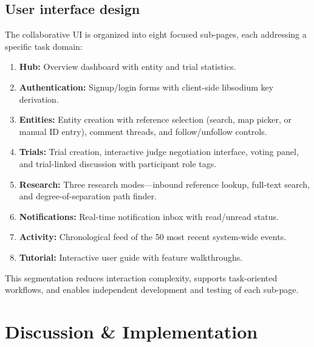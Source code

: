 \documentclass[13pt,a4paper]{report}
\begin{document}
\section{User interface design}
The collaborative UI is organized into eight focused sub-pages, each addressing a specific task domain:
\begin{enumerate}
    \item \textbf{Hub:} Overview dashboard with entity and trial statistics.
    \item \textbf{Authentication:} Signup/login forms with client-side libsodium key derivation.
    \item \textbf{Entities:} Entity creation with reference selection (search, map picker, or manual ID entry), comment threads, and follow/unfollow controls.
    \item \textbf{Trials:} Trial creation, interactive judge negotiation interface, voting panel, and trial-linked discussion with participant role tags.
    \item \textbf{Research:} Three research modes---inbound reference lookup, full-text search, and degree-of-separation path finder.
    \item \textbf{Notifications:} Real-time notification inbox with read/unread status.
    \item \textbf{Activity:} Chronological feed of the 50 most recent system-wide events.
    \item \textbf{Tutorial:} Interactive user guide with feature walkthroughs.
\end{enumerate}
This segmentation reduces interaction complexity, supports task-oriented workflows, and enables independent development and testing of each sub-page.

\chapter{Discussion \& Implementation}
\end{document}
